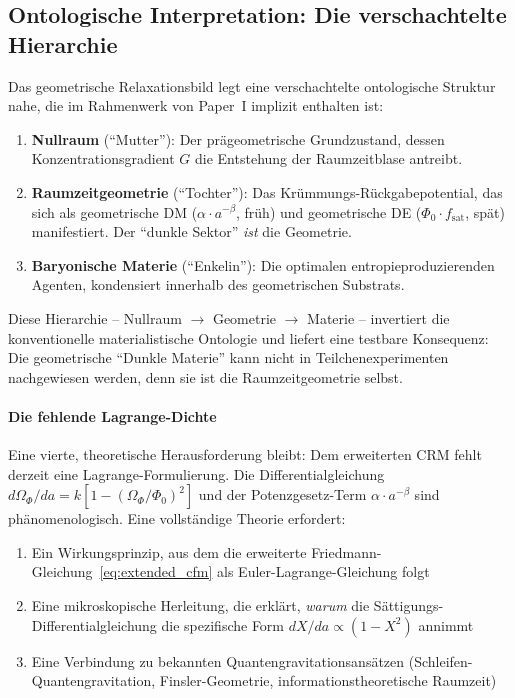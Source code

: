 \documentclass[aps,prd,twocolumn,superscriptaddress,nofootinbib]{revtex4-2}
\begin{document}
\subsection{Ontologische Interpretation: Die verschachtelte Hierarchie}
\label{subsec:nested}

Das geometrische Relaxationsbild legt eine verschachtelte ontologische Struktur nahe, die im Rahmenwerk von Paper~I \cite{Geiger2026} implizit enthalten ist:

\begin{enumerate}
\item \textbf{Nullraum} ("`Mutter"'): Der pr\"ageometrische Grundzustand, dessen Konzentrationsgradient $G$ die Entstehung der Raumzeitblase antreibt.
\item \textbf{Raumzeitgeometrie} ("`Tochter"'): Das Kr\"ummungs-R\"uckgabepotential, das sich als geometrische DM ($\alpha \cdot a^{-\beta}$, fr\"uh) und geometrische DE ($\Phi_0 \cdot f_{\mathrm{sat}}$, sp\"at) manifestiert. Der "`dunkle Sektor"' \textit{ist} die Geometrie.
\item \textbf{Baryonische Materie} ("`Enkelin"'): Die optimalen entropieproduzierenden Agenten, kondensiert innerhalb des geometrischen Substrats.
\end{enumerate}

Diese Hierarchie -- Nullraum $\to$ Geometrie $\to$ Materie -- invertiert die konventionelle materialistische Ontologie und liefert eine testbare Konsequenz: Die geometrische "`Dunkle Materie"' kann nicht in Teilchenexperimenten nachgewiesen werden, denn sie ist die Raumzeitgeometrie selbst.

\paragraph{Die fehlende Lagrange-Dichte}

Eine vierte, theoretische Herausforderung bleibt: Dem erweiterten CRM fehlt derzeit eine Lagrange-Formulierung. Die Differentialgleichung $d\Omega_\Phi/da = k[1 - (\Omega_\Phi/\Phi_0)^2]$ und der Potenzgesetz-Term $\alpha \cdot a^{-\beta}$ sind ph\"anomenologisch. Eine vollst\"andige Theorie erfordert:
\begin{enumerate}
\item Ein Wirkungsprinzip, aus dem die erweiterte Friedmann-Gleichung~\eqref{eq:extended_cfm} als Euler-Lagrange-Gleichung folgt
\item Eine mikroskopische Herleitung, die erkl\"art, \textit{warum} die S\"attigungs-Differentialgleichung die spezifische Form $dX/da \propto (1 - X^2)$ annimmt
\item Eine Verbindung zu bekannten Quantengravitationsans\"atzen (Schleifen-Quantengravitation, Finsler-Geometrie, informationstheoretische Raumzeit)
\end{enumerate}
\end{document}
